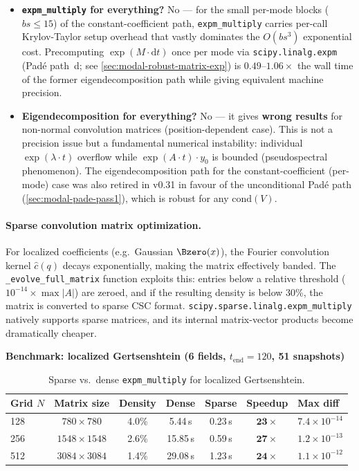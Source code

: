 \begin{itemize}
  \item \textbf{\texttt{expm\_multiply} for everything?} No --- for the small per-mode blocks ($bs \le 15$) of the constant-coefficient path, \texttt{expm\_multiply} carries per-call Krylov-Taylor setup overhead that vastly dominates the $O(bs^3)$ exponential cost. Precomputing $\exp(M \cdot \mathrm{d}t)$ once per mode via \texttt{scipy.linalg.expm} (Pad\'{e} path~d; see \cref{sec:modal-robust-matrix-exp}) is $0.49$--$1.06\times$ the wall time of the former eigendecomposition path while giving equivalent machine precision.
  \item \textbf{Eigendecomposition for everything?} No --- it gives \textbf{wrong results} for non-normal convolution matrices (position-dependent case). This is not a precision issue but a fundamental numerical instability: individual $\exp(\lambda \cdot t)$ overflow while $\exp(A \cdot t) \cdot y_0$ is bounded (pseudospectral phenomenon). The eigendecomposition path for the constant-coefficient (per-mode) case was also retired in v0.31 in favour of the unconditional Pad\'{e} path (\cref{sec:modal-pade-pass1}), which is robust for any $\mathrm{cond}(V)$.
\end{itemize}

\paragraph{Sparse convolution matrix optimization.}
\label{par:modal-sparse}

For localized coefficients (e.g.\ Gaussian $\Bzero(x)$), the Fourier convolution kernel $\hat{c}(q)$ decays exponentially, making the matrix effectively banded. The \texttt{\_evolve\_full\_matrix} function exploits this: entries below a relative threshold ($10^{-14} \times \max|A|$) are zeroed, and if the resulting density is below 30\%, the matrix is converted to sparse CSC format. \texttt{scipy.sparse.linalg.expm\_multiply} natively supports sparse matrices, and its internal matrix-vector products become dramatically cheaper.

\textbf{Benchmark: localized Gertsenshtein (6 fields, $t_\text{end}=120$, 51 snapshots)}

\begin{table}[htbp]
\centering
\caption{Sparse vs.\ dense \texttt{expm\_multiply} for localized Gertsenshtein.}
\label{tab:sparse-benchmark}
\begin{tabular}{@{}lcccccl@{}}
\toprule
Grid $N$ & Matrix size & Density & Dense & Sparse & Speedup & Max diff \\
\midrule
128 & $780\times 780$ & 4.0\% & 5.44\,s & 0.23\,s & $\mathbf{23\times}$ & $7.4\times 10^{-14}$ \\
256 & $1548\times 1548$ & 2.6\% & 15.85\,s & 0.59\,s & $\mathbf{27\times}$ & $1.2\times 10^{-13}$ \\
512 & $3084\times 3084$ & 1.4\% & 29.08\,s & 1.23\,s & $\mathbf{24\times}$ & $1.1\times 10^{-12}$ \\
\bottomrule
\end{tabular}
\end{table}


